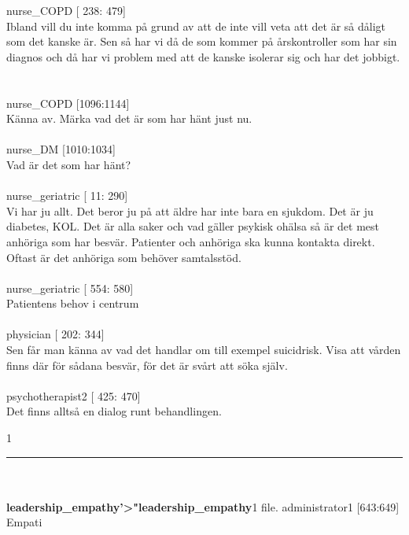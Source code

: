 \documentclass[12pt,a4paper,oneside]{article}
\begin{document}
 nurse\_COPD [ 238: 479]\\ 
Ibland vill du inte komma p{\aa} grund av att de inte vill veta att det {\"a}r s{\aa} d{\aa}ligt som det kanske {\"a}r. Sen s{\aa} har vi d{\aa} de som kommer p{\aa} {\aa}rskontroller som har sin diagnos och d{\aa} har vi problem med att de kanske isolerar sig och har det jobbigt. %
\ \\\ \\
 nurse\_COPD [1096:1144]\\ 
K{\"a}nna av. M{\"a}rka vad det {\"a}r som har h{\"a}nt just nu. %
\ \\\ \\
 nurse\_DM [1010:1034]\\ 
Vad {\"a}r det som har h{\"a}nt? %
\ \\\ \\
 nurse\_geriatric [  11: 290]\\ 
Vi har ju allt. Det beror ju p{\aa} att {\"a}ldre har inte bara en sjukdom. Det {\"a}r ju diabetes, KOL. Det {\"a}r alla saker och vad g{\"a}ller psykisk oh{\"a}lsa s{\aa} {\"a}r det mest anh{\"o}riga som har besv{\"a}r. Patienter och anh{\"o}riga ska kunna kontakta direkt. Oftast {\"a}r det anh{\"o}riga som beh{\"o}ver samtalsst{\"o}d.  %
\ \\\ \\
 nurse\_geriatric [ 554: 580]\\ 
Patientens behov i centrum %
\ \\\ \\
 physician [ 202: 344]\\ 
Sen f{\aa}r man k{\"a}nna av vad det handlar om till exempel suicidrisk. Visa att v{\aa}rden finns d{\"a}r f{\"o}r s{\aa}dana besv{\"a}r, f{\"o}r det {\"a}r sv{\aa}rt att s{\"o}ka sj{\"a}lv. %
\ \\\ \\
 psychotherapist2 [ 425: 470]\\ 
Det finns allts{\aa} en dialog runt behandlingen. %

1 
\hrule
\ \\\ \\{\bf leadership\_empathy'>"leadership\_empathy}1 file.
 administrator1 [643:649]\\ 
Empati %
\end{document}
